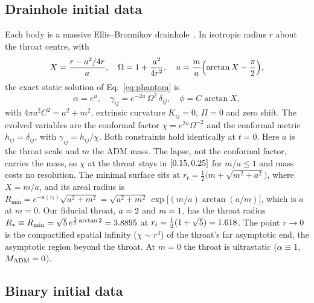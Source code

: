 \documentclass[twocolumn,floatfix,aps,prd,superscriptaddress,nofootinbib,showkeys]{revtex4-2}
\begin{document}
\subsection{Drainhole initial data}
\label{sec:model:drainhole}

Each body is a massive Ellis--Bronnikov drainhole~\cite{ellis1973,bronnikov1973}. In isotropic radius $r$ about the throat centre, with
\begin{equation}
X = \frac{r - a^2/4r}{a},\quad
\Omega = 1 + \frac{a^2}{4r^2},\quad
u = \frac{m}{a}\Bigl(\arctan X - \frac{\pi}{2}\Bigr),
\end{equation}
the exact static solution of Eq.~\eqref{eq:phantom} is
\begin{equation}
\alpha = e^{u},\quad
\gamma_{ij} = e^{-2u}\,\Omega^2\,\delta_{ij},\quad
\phi = C\arctan X,
\label{eq:drainhole}
\end{equation}
with $4\pi a^2C^2 = a^2+m^2$, extrinsic curvature $K_{ij}=0$, $\Pi=0$ and zero shift. The evolved variables are the conformal factor $\chi = e^{2u}\Omega^{-2}$ and the conformal metric $h_{ij}=\delta_{ij}$, with $\gamma_{ij}=h_{ij}/\chi$. Both constraints hold identically at $t=0$. Here $a$ is the throat scale and $m$ the ADM mass. The lapse, not the conformal factor, carries the mass, so $\chi$ at the throat stays in $[0.15,0.25]$ for $m/a\le1$ and mass costs no resolution. The minimal surface sits at $r_t=\tfrac12\bigl(m+\sqrt{m^2+a^2}\bigr)$, where $X=m/a$, and its areal radius is $R_{\min}=e^{-u(r_t)}\sqrt{a^2+m^2}=\sqrt{a^2+m^2}\,\exp\!\bigl[(m/a)\arctan(a/m)\bigr]$, which is $a$ at $m=0$. Our fiducial throat, $a=2$ and $m=1$, has the throat radius $R_\star\equiv R_{\min}=\sqrt5\,e^{\frac12\arctan2}=3.8895$ at $r_t=\tfrac12(1+\sqrt5)=1.618$. The point $r\to0$ is the compactified spatial infinity ($\chi\sim r^4$) of the throat's far asymptotic end, the asymptotic region beyond the throat. At $m=0$ the throat is ultrastatic ($\alpha\equiv1$, $M_{\rm ADM}=0$).

\subsection{Binary initial data}
\label{sec:model:binary}
\end{document}
